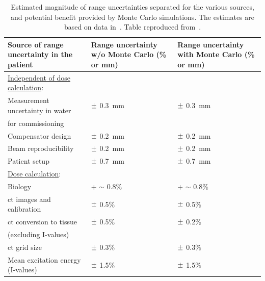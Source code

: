 \begin{table}[!htbp]
\centering
\caption{Estimated magnitude of range uncertainties separated for the various sources, and potential benefit provided by Monte Carlo simulations. The estimates are based on data in~\parencite{Matsufuji1998, Schaffner1998, Chvetsov2010, Bichsel1992, ICRU1993, Kumazaki2007, Espana2010, Urie1986, Sawakuchi2008, Bednarz2010, Wouters1996, Robertson1975, Paganetti2000}. Table reproduced from~\cite{Durante2016}.}
\label{chap1::tab::uncertainties}
\begin{tabular}{m{6cm} P{3.6cm}  P{3.6cm}}
\toprule
{} 
\textbf{Source of range uncertainty in the patient}& \textbf{Range uncertainty w/o Monte Carlo (\% or mm)} & \textbf{Range uncertainty with Monte Carlo (\% or mm)} \\
\midrule
\underline{Independent of dose calculation}: & & \\
\hspace{0.2cm} Measurement uncertainty in water & $\varpm$ 0.3~mm & $\varpm$ 0.3~mm \\
\hspace{0.2cm} for commissioning  & & \\
\hspace{0.2cm} Compensator design & $\varpm$ 0.2~mm & $\varpm$ 0.2~mm \\
\hspace{0.2cm} Beam reproducibility & $\varpm$ 0.2~mm & $\varpm$ 0.2~mm \\
\hspace{0.2cm} Patient setup & $\varpm$ 0.7~mm & $\varpm$ 0.7~mm \\
\underline{Dose calculation}: & & \\
\hspace{0.2cm}  Biology & + $\sim$ 0.8\% & + $\sim$ 0.8\% \\
\hspace{0.2cm}  \gls{ct} images and calibration & $\varpm$ 0.5\% & $\varpm$ 0.5\% \\
\hspace{0.2cm}  \gls{ct} conversion to tissue & $\varpm$ 0.5\% & $\varpm$ 0.2\% \\
\hspace{0.2cm} (excluding I-values) & & \\
\hspace{0.2cm}  \gls{ct} grid size & $\varpm$ 0.3\% & $\varpm$ 0.3\% \\
\hspace{0.2cm}  Mean excitation energy (I-values) & $\varpm$ 1.5\% & $\varpm$ 1.5\%  \\

\end{tabular}
\end{table}
